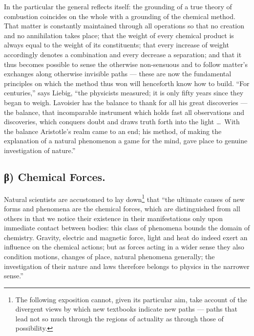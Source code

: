 \documentclass[12pt,a4paper]{book}
\begin{document}
In the particular the general reflects itself: the grounding of a true theory
of combustion coincides on the whole with a grounding of the chemical method.
That matter is constantly maintained through all operations so that no creation
and no annihilation takes place; that the weight of every chemical product is
always equal to the weight of its constituents; that every increase of weight
accordingly denotes a combination and every decrease a separation; and that it
thus becomes possible to sense the otherwise non-sensuous and to follow
matter's exchanges along otherwise invisible paths --- these are now the
fundamental principles on which the method thus won will henceforth know how to
build. ``For centuries,'' says Liebig, ``the physicists measured; it is only
fifty years since they began to weigh. Lavoisier has the balance to thank for
all his great discoveries --- the balance, that incomparable instrument which
holds fast all observations and discoveries, which conquers doubt and draws
truth forth into the light \ldots\ With the balance Aristotle's realm came to
an end; his method, of making the explanation of a natural phenomenon a game
for the mind, gave place to genuine investigation of nature.''

\subsection*{β) Chemical Forces.}

Natural scientists are accustomed to lay down\footnote{The following exposition
cannot, given its particular aim, take account of the divergent views by which
new
textbooks indicate new paths --- paths that lead not so much through the
regions of actuality as through those of possibility.} that ``the ultimate
causes of
new forms and phenomena are the chemical forces, which are distinguished from
all others in that we notice their existence in their manifestations only upon
immediate contact between bodies: this class of phenomena bounds the domain of
chemistry. Gravity, electric and magnetic force, light and heat do indeed exert
an influence on the chemical actions; but as forces acting in a wider sense
they also condition motions, changes of place, natural phenomena generally; the
investigation of their nature and laws therefore belongs to physics in the
narrower sense.''
\end{document}
